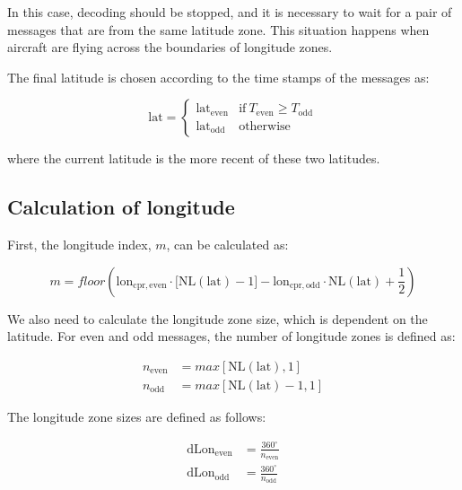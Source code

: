 In this case, decoding should be stopped, and it is necessary to wait for a pair of messages that are from the same latitude zone. This situation happens when aircraft are flying across the boundaries of longitude zones.


The final latitude is chosen according to the time stamps of the messages as:

\begin{equation}
  \mathrm{lat} =
  \begin{cases}
   \mathrm{lat}_\mathrm{even}     & \text{if}~T_\mathrm{even} \ge T_\mathrm{odd} \\
   \mathrm{lat}_\mathrm{odd}     & \text{otherwise}
  \end{cases}
\end{equation}

where the current latitude is the more recent of these two latitudes.

\subsection{Calculation of longitude} \label{sec:cpr_airborne_global_lon}

First, the longitude index, $m$, can be calculated as:

\begin{equation}
  m = floor \left( \mathrm{lon}_\mathrm{cpr, even} \cdot \Big[ \mathrm{NL}(\mathrm{lat})-1 \Big] - \mathrm{lon}_\mathrm{cpr,odd} \cdot \mathrm{NL}(\mathrm{lat}) + \frac{1}{2}  \right)
\end{equation}


We also need to calculate the longitude zone size, which is dependent on the latitude. For even and odd messages, the number of longitude zones is defined as:

\begin{equation}
\begin{split}
  n_\mathrm{even} &= max[\mathrm{NL}(\mathrm{lat}), 1] \\
  n_\mathrm{odd} &= max[\mathrm{NL}(\mathrm{lat})-1, 1]
\end{split}
\end{equation}


The longitude zone sizes are defined as follows:

\begin{equation}
\begin{split}
  \mathrm{dLon}_\mathrm{even} &= \frac{360^\circ}{n_\mathrm{even}} \\
  \mathrm{dLon}_\mathrm{odd} &= \frac{360^\circ}{n_\mathrm{odd}}
\end{split}
\end{equation}


